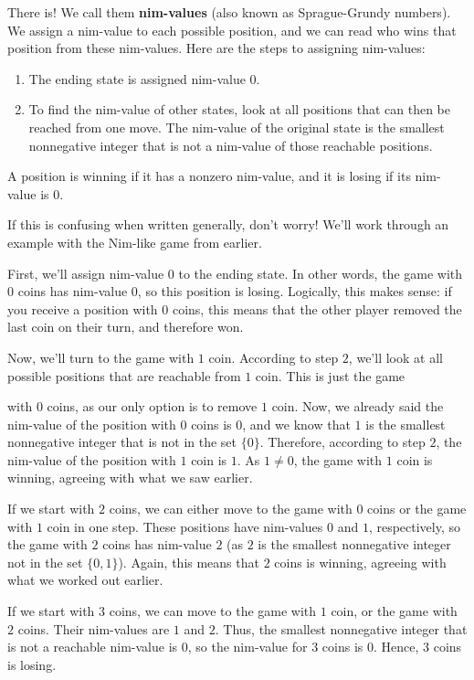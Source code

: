 \documentclass{article}
\begin{document}
\begin{multicols}{3}
There is! We call them \textbf{nim-values} (also known as Sprague-Grundy numbers). We assign a nim-value to each possible position, and we can read who wins that position from these nim-values. Here are the steps to assigning nim-values:

\begin{enumerate}
    \item The ending state is assigned nim-value $0$.
    \item To find the nim-value of other states, look at all positions that can then be reached from one move. The nim-value of the original state is the smallest nonnegative integer that is not a nim-value of those reachable positions.
\end{enumerate}

A position is winning if it has a nonzero nim-value, and it is losing if its nim-value is $0$.

If this is confusing when written generally, don't worry! We'll work through an example with the Nim-like game from earlier.

First, we'll assign nim-value $0$ to the ending state. In other words, the game with $0$ coins has nim-value $0$, so this position is losing. Logically, this makes sense: if you receive a position with $0$ coins, this means that the other player removed the last coin on their turn, and therefore won.

Now, we'll turn to the game with $1$ coin. According to step $2$, we'll look at all possible positions that are reachable from $1$ coin. This is just the game 

with $0$ coins, as our only option is to remove $1$ coin. Now, we already said the nim-value of the position with $0$ coins is $0$, and we know that $1$ is the smallest nonnegative integer that is not in the set $\{0\}$. Therefore, according to step $2$, the nim-value of the position with $1$ coin is $1$. As $1\neq 0$, the game with $1$ coin is winning, agreeing with what we saw earlier.

If we start with $2$ coins, we can either move to the game with $0$ coins or the game with $1$ coin in one step. These positions have nim-values $0$ and $1$, respectively, so the game with $2$ coins has nim-value $2$ (as $2$ is the smallest nonnegative integer not in the set $\{0, 1\}$). Again, this means that $2$ coins is winning, agreeing with what we worked out earlier.

If we start with $3$ coins, we can move to the game with $1$ coin, or the game with $2$ coins. Their nim-values are $1$ and $2$. Thus, the smallest nonnegative integer that is not a reachable nim-value is $0$, so the nim-value for $3$ coins is $0$. Hence, $3$ coins is losing.


\end{multicols}
\end{document}
